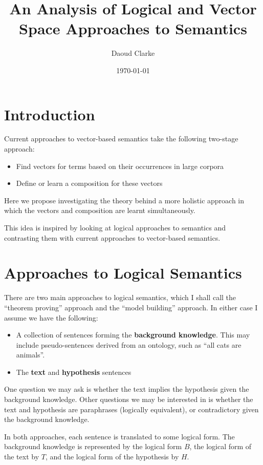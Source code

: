 \documentclass{article}
\author{Daoud Clarke}
\date{\today}
\title{An Analysis of Logical and Vector Space Approaches to Semantics}
\begin{document}
\maketitle

\section{Introduction}

Current approaches to vector-based semantics take the following
two-stage approach:
\begin{itemize}
\item Find vectors for terms based on their occurrences in large
  corpora
\item Define or learn a composition for these vectors
\end{itemize}
Here we propose investigating the theory behind a more holistic
approach in which the vectors and composition are learnt
simultaneously.

This idea is inspired by looking at logical approaches to semantics
and contrasting them with current approaches to vector-based
semantics.

\section{Approaches to Logical Semantics}

There are two main approaches to logical semantics, which I shall call
the ``theorem proving'' approach and the ``model building''
approach. In either case I assume we have the following:
\begin{itemize}
\item A collection of sentences forming the \textbf{background
  knowledge}. This may include pseudo-sentences derived from an
  ontology, such as ``all cats are animals''.
\item The \textbf{text} and \textbf{hypothesis} sentences
\end{itemize}
One question we may ask is whether the text implies the hypothesis
given the background knowledge. Other questions we may be interested
in is whether the text and hypothesis are paraphrases (logically
equivalent), or contradictory given the background knowledge.

In both approaches, each sentence is translated to some logical
form. The background knowledge is represented by the logical form $B$,
the logical form of the text by $T$, and the logical form of the
hypothesis by $H$.
\end{document}
